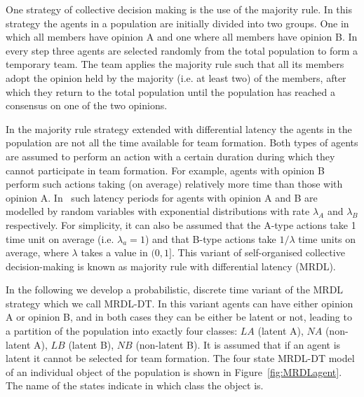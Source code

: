\documentclass{amsart}
\begin{document}
One strategy of collective decision making is the use of the majority rule. In this strategy the agents in a population are initially divided into two groups. One in which all members have opinion A and one where all members have opinion B. In every step three agents are selected randomly from the total population to form a temporary team. The team applies the majority rule such that all its members adopt the opinion held by the majority (i.e. at least two) of the members, after which they return to the total population until the population has reached a consensus on one of the two opinions. 

In the majority rule strategy extended with differential latency the agents in the population are not all the time available for team formation. Both types of agents are assumed to perform an action with a certain duration during which they cannot participate in team formation. For example, agents with opinion B perform such actions taking (on average) relatively more time than those with opinion A. In~\cite{Mo+11} such latency periods for agents with opinion A and B are modelled by random variables with exponential distributions with rate $\lambda_A$ and $\lambda_B$ respectively.  For simplicity, it can also be assumed that the A-type actions take 1 time unit on average (i.e. $\lambda_a=1$) and that B-type actions take $1/\lambda$ time units on average, where $\lambda$ takes a value in $(0,1]$. This variant of self-organised collective decision-making is known as majority rule with differential latency (MRDL).

In the following we develop a probabilistic, discrete time variant of the MRDL strategy which we call MRDL-DT. In this variant agents can have either opinion A or opinion B, and in both cases they can be either be latent or not, leading to a partition of the population into exactly four classes: $\mathit{LA}$ (latent A), $\mathit{NA}$ (non-latent A), $\mathit{LB}$ (latent B), $\mathit{NB}$ (non-latent B). It is assumed that if an agent is latent it cannot be selected for team formation. The four state MRDL-DT model of an individual object of the population is shown in Figure~\ref{fig:MRDLagent}. The name of the states indicate in which class the object is.
\end{document}
